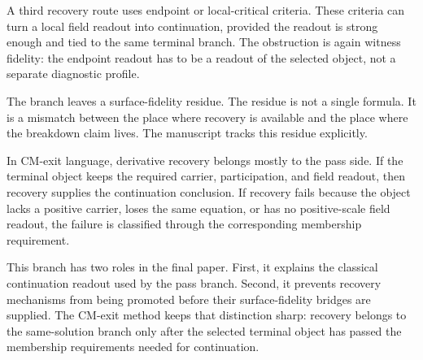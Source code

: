 A third recovery route uses endpoint or local-critical criteria. These criteria
can turn a local field readout into continuation, provided the readout is strong
enough and tied to the same terminal branch. The obstruction is again witness
fidelity: the endpoint readout has to be a readout of the selected object, not a
separate diagnostic profile.

The branch leaves a surface-fidelity residue. The residue is not a
single formula. It is a mismatch between the place where recovery is available
and the place where the breakdown claim lives. The manuscript tracks
this residue explicitly.

In CM-exit language, derivative recovery belongs mostly to the pass side. If the
terminal object keeps the required carrier, participation, and field readout,
then recovery supplies the continuation conclusion. If recovery fails because the
object lacks a positive carrier, loses the same equation, or has no positive-scale
field readout, the failure is classified through the corresponding membership
requirement.

This branch has two roles in the final paper. First, it explains the
classical continuation readout used by the pass branch. Second, it prevents
recovery mechanisms from being promoted before their surface-fidelity bridges
are supplied. The CM-exit method keeps that distinction sharp: recovery
belongs to the same-solution branch only after the selected terminal object has
passed the membership requirements needed for continuation.
